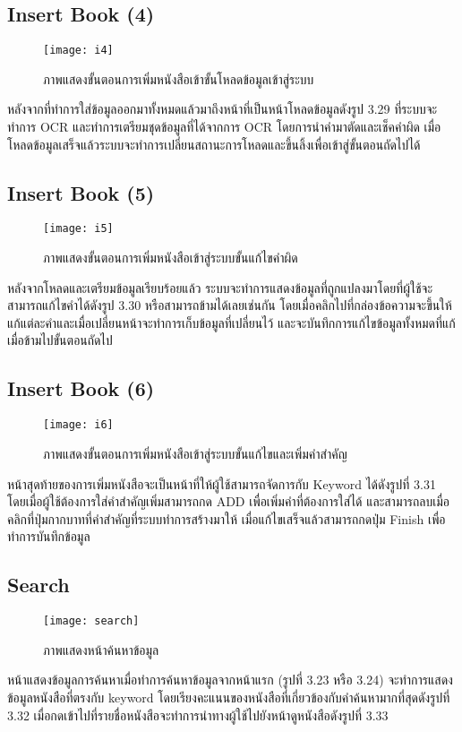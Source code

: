\subsection{Insert Book (4)}
\begin{figure}[H]
    \centering
    \texttt{[image: i4]}
    \caption{ภาพแสดงขั้นตอนการเพิ่มหนังสือเข้าขั้นโหลดข้อมูลเข้าสู่ระบบ}\label{fig:i4}
\end{figure}
หลังจากที่ทำการใส่ข้อมูลออกมาทั้งหมดแล้วมาถึงหน้าที่เป็นหน้าโหลดข้อมูลดังรูป 3.29 ที่ระบบจะทำการ OCR และทำการเตรียมชุดข้อมูลที่ได้จากการ OCR โดยการนำคำมาตัดและเช็คคำผิด เมื่อโหลดข้อมูลเสร็จแล้วระบบจะทำการเปลี่ยนสถานะการโหลดและขึ้นลิ้งเพื่อเข้าสู่ขั้นตอนถัดไปได้

\subsection{Insert Book (5)}
\begin{figure}[H]
    \centering
    \texttt{[image: i5]}
    \caption{ภาพแสดงขั้นตอนการเพิ่มหนังสือเข้าสู่ระบบขั้นแก้ไขคำผิด}\label{fig:i5}
\end{figure}
หลังจากโหลดและเตรียมข้อมูลเรียบร้อยแล้ว ระบบจะทำการแสดงข้อมูลที่ถูกแปลงมาโดยที่ผู้ใช้จะสามารถแก้ไขคำได้ดังรูป 3.30 หรือสามารถข้ามได้เลยเช่นกัน โดยเมื่อคลิกไปที่กล่องข้อความจะขึ้นให้แก้แต่ละคำและเมื่อเปลี่ยนหน้าจะทำการเก็บข้อมูลที่เปลี่ยนไว้ และจะบันทึกการแก้ไขข้อมูลทั้งหมดที่แก้เมื่อข้ามไปขั้นตอนถัดไป

\subsection{Insert Book (6) }
\begin{figure}[H]
    \centering
    \texttt{[image: i6]}
    \caption{ภาพแสดงขั้นตอนการเพิ่มหนังสือเข้าสู่ระบบขั้นแก้ไขและเพิ่มคำสำคัญ}\label{fig:i6}
\end{figure}
หน้าสุดท้ายของการเพิ่มหนังสือจะเป็นหน้าที่ให้ผู้ใช้สามารถจัดการกับ Keyword ได้ดังรูปที่ 3.31 โดยเมื่อผู้ใช้ต้องการใส่คำสำคัญเพิ่มสามารถกด ADD เพื่อเพิ่มคำที่ต้องการใส่ได้ และสามารถลบเมื่อคลิกที่ปุ่มกากบาทที่คำสำคัญที่ระบบทำการสร้างมาให้ เมื่อแก้ไขเสร็จแล้วสามารถกดปุ่ม Finish เพื่อทำการบันทึกข้อมูล

\subsection{Search}
\begin{figure}[H]
    \centering
    \texttt{[image: search]}
    \caption{ภาพแสดงหน้าค้นหาข้อมูล}\label{fig:search}
\end{figure}
หน้าแสดงข้อมูลการค้นหาเมื่อทำการค้นหาข้อมูลจากหน้าแรก (รูปที่ 3.23 หรือ 3.24) จะทำการแสดงข้อมูลหนังสือที่ตรงกับ keyword โดยเรียงคะแนนของหนังสือที่เกี่ยวข้องกับคำค้นหามากที่สุดดังรูปที่ 3.32 เมื่อกดเข้าไปที่รายชื่อหนังสือจะทำการนำทางผู้ใช้ไปยังหน้าดูหนังสือดังรูปที่ 3.33

